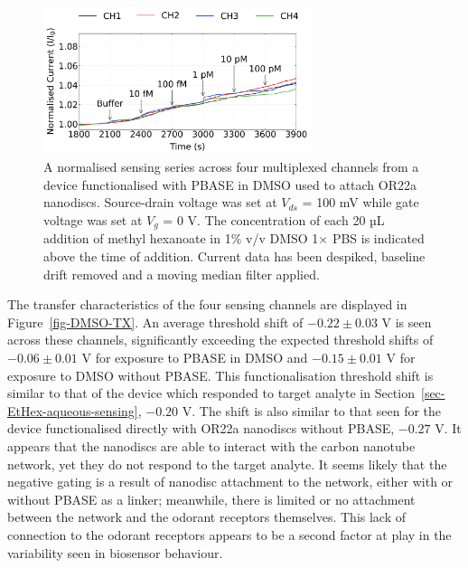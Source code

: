 \documentclass[
  a4paper,
]{scrbook}
\begin{document}
\begin{figure}

{\centering \includegraphics[width=0.7\textwidth,height=\textheight]{figures/ch7/NTQ25C10_OR22a_sample_220208_filtered_detrend_trunc_arrows_normalised.png}

}

\caption[A normalised and filtered sensing series across four
multiplexed channels from a device functionalised with PBASE in DMSO
used to attach OR22a nanodiscs.]{\label{fig-DMSO-sensing}A normalised
sensing series across four multiplexed channels from a device
functionalised with PBASE in DMSO used to attach OR22a nanodiscs.
Source-drain voltage was set at \(V_{ds}\) = 100 mV while gate voltage
was set at \(V_g\) = 0 V. The concentration of each 20 µL addition of
methyl hexanoate in 1\% v/v DMSO 1× PBS is indicated above the time of
addition. Current data has been despiked, baseline drift removed and a
moving median filter applied.}

\end{figure}

The transfer characteristics of the four sensing channels are displayed
in Figure~\ref{fig-DMSO-TX}. An average threshold shift of
\(-0.22 \pm 0.03\) V is seen across these channels, significantly
exceeding the expected threshold shifts of \(-0.06 \pm 0.01\) V for
exposure to PBASE in DMSO and \(-0.15 \pm 0.01\) V for exposure to DMSO
without PBASE. This functionalisation threshold shift is similar to that
of the device which responded to target analyte in
Section~\ref{sec-EtHex-aqueous-sensing}, \(-0.20\) V. The shift is also
similar to that seen for the device functionalised directly with OR22a
nanodiscs without PBASE, \(-0.27\) V. It appears that the nanodiscs are
able to interact with the carbon nanotube network, yet they do not
respond to the target analyte. It seems likely that the negative gating
is a result of nanodisc attachment to the network, either with or
without PBASE as a linker; meanwhile, there is limited or no attachment
between the network and the odorant receptors themselves. This lack of
connection to the odorant receptors appears to be a second factor at
play in the variability seen in biosensor behaviour.
\end{document}

